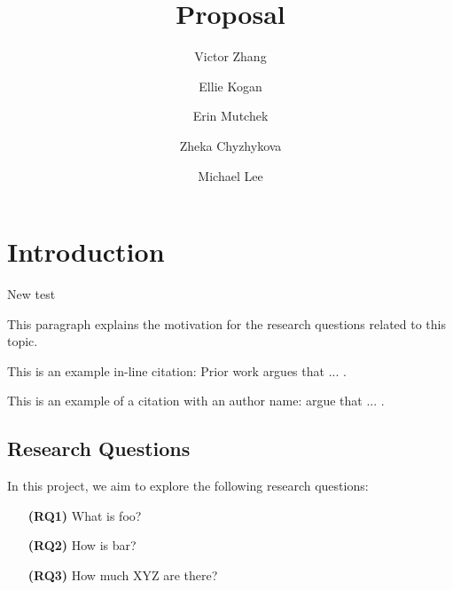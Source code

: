 \documentclass[manuscript,authorversion,nonacm]{acmart} %
\begin{document}
\title[Proposal]{Proposal}


\author{Victor Zhang}
\author{Ellie Kogan}
\author{Erin Mutchek}
\author{Zheka Chyzhykova}
\author{Michael Lee}

\renewcommand{\shortauthors}{Short author names (just last names)}

\maketitle



\section{Introduction}

New test 

This paragraph explains the motivation for the research questions related to this topic.

This is an example in-line citation: Prior work argues that ... \cite{andalibi2017sensitive}. \newline

This is an example of a citation with an author name: \citet{andalibi2017sensitive} argue that ... .



\subsection{Research Questions}

In this project, we aim to explore the following research questions:

\begin{itemize}
    \item [\textbf{(RQ1)}] What is foo?
    \item [\textbf{(RQ2)}] How is bar?
    \item [\textbf{(RQ3)}] How much XYZ are there?
\end{itemize}
\end{document}
